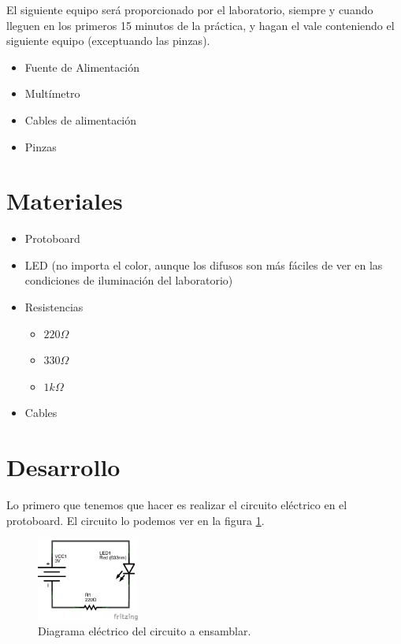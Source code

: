 	El siguiente equipo será proporcionado por el laboratorio, siempre y cuando lleguen en los primeros 15 minutos de la práctica, y hagan el vale conteniendo el siguiente equipo (exceptuando las pinzas).

	\begin{itemize}
		\item Fuente de Alimentación
		\item Multímetro
		\item Cables de alimentación
		\item Pinzas
	\end{itemize}


\section{Materiales}

	\begin{itemize}
		\item Protoboard
		\item LED (no importa el color, aunque los difusos son más fáciles de ver en las condiciones de iluminación del laboratorio)
		\item Resistencias
		\begin{itemize}
			\item $220 \Omega$
			\item $330 \Omega$
			\item $1 k\Omega$
		\end{itemize}
		\item Cables
	\end{itemize}


\section{Desarrollo}

    Lo primero que tenemos que hacer es realizar el circuito eléctrico en el protoboard. El circuito lo podemos ver en la figura \ref{dia:elecir}. \\

    \begin{figure}[h]
    	\begin{center}
    		\includegraphics[width=0.3\textwidth]{images/LED-bateria-diagrama.png}
    		\caption{Diagrama eléctrico del circuito a ensamblar.}
    		\label{dia:elecir}
    	\end{center}
    \end{figure}

